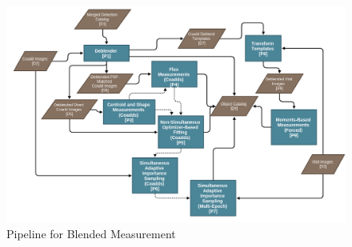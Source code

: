 \documentclass[10pt]{article}
\begin{document}
\begin{figure}
\includegraphics[width=\columnwidth]{flowchart.png}
\caption{Pipeline for Blended Measurement}
\label{fig:flowchart}
\end{figure}
\end{document}
